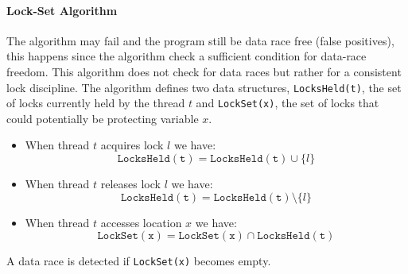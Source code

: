 \paragraph{Lock-Set Algorithm}
The algorithm may fail and the program still be data race free (false positives),
this happens since the algorithm check a sufficient condition for data-race freedom.
This algorithm does not check for data races but rather for a consistent lock discipline.
The algorithm defines two data structures, \texttt{LocksHeld(t)}, the set of locks currently held by the thread $t$ and
\texttt{LockSet(x)}, the set of locks that could potentially be protecting variable $x$.
\begin{itemize}
    \item When thread $t$ acquires lock $l$ we have:$$\mathtt{LocksHeld(t)} = \mathtt{LocksHeld(t)} \cup \{l\}$$
    \item When thread $t$ releases lock $l$ we have:$$\mathtt{LocksHeld(t)} = \mathtt{LocksHeld(t)} \setminus \{l\}$$
    \item When thread $t$ accesses location $x$ we have:$$\mathtt{LockSet(x)} = \mathtt{LockSet(x)} \cap \mathtt{LocksHeld(t)}$$
\end{itemize}
A data race is detected if \texttt{LockSet(x)} becomes empty.
